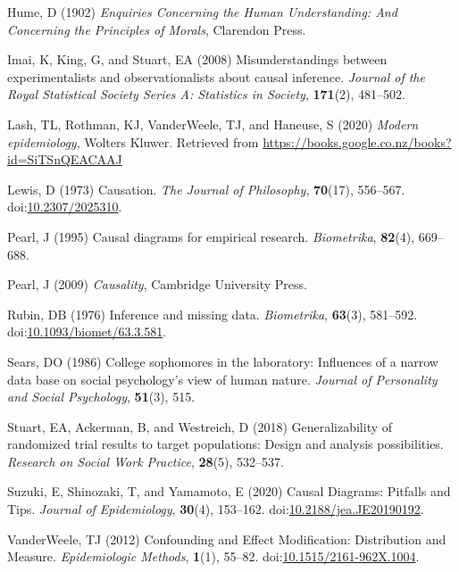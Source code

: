 \documentclass[
  single column]{article}
\newlength{\cslhangindent}
\newenvironment{CSLReferences}[2] %
 {\begin{list}{}{%
  \setlength{\itemindent}{0pt}
  \setlength{\leftmargin}{0pt}
  \setlength{\parsep}{0pt}
  \ifodd #1
   \setlength{\leftmargin}{\cslhangindent}
   \setlength{\itemindent}{-1\cslhangindent}
  \fi
  \setlength{\itemsep}{#2\baselineskip}}}
 {\end{list}}
\begin{document}
\begin{CSLReferences}{1}{0}
Hume, D (1902) \emph{Enquiries Concerning the Human Understanding: And
Concerning the Principles of Morals}, Clarendon Press.

Imai, K, King, G, and Stuart, EA (2008) Misunderstandings between
experimentalists and observationalists about causal inference.
\emph{Journal of the Royal Statistical Society Series A: Statistics in
Society}, \textbf{171}(2), 481--502.

Lash, TL, Rothman, KJ, VanderWeele, TJ, and Haneuse, S (2020)
\emph{Modern epidemiology}, Wolters Kluwer. Retrieved from
\url{https://books.google.co.nz/books?id=SiTSnQEACAAJ}

Lewis, D (1973) Causation. \emph{The Journal of Philosophy},
\textbf{70}(17), 556--567.
doi:\href{https://doi.org/10.2307/2025310}{10.2307/2025310}.

Pearl, J (1995) Causal diagrams for empirical research.
\emph{Biometrika}, \textbf{82}(4), 669--688.

Pearl, J (2009) \emph{Causality}, Cambridge University Press.

Rubin, DB (1976) Inference and missing data. \emph{Biometrika},
\textbf{63}(3), 581--592.
doi:\href{https://doi.org/10.1093/biomet/63.3.581}{10.1093/biomet/63.3.581}.

Sears, DO (1986) College sophomores in the laboratory: Influences of a
narrow data base on social psychology's view of human nature.
\emph{Journal of Personality and Social Psychology}, \textbf{51}(3),
515.

Stuart, EA, Ackerman, B, and Westreich, D (2018) Generalizability of
randomized trial results to target populations: Design and analysis
possibilities. \emph{Research on Social Work Practice}, \textbf{28}(5),
532--537.

Suzuki, E, Shinozaki, T, and Yamamoto, E (2020) Causal Diagrams:
Pitfalls and Tips. \emph{Journal of Epidemiology}, \textbf{30}(4),
153--162.
doi:\href{https://doi.org/10.2188/jea.JE20190192}{10.2188/jea.JE20190192}.

VanderWeele, TJ (2012) Confounding and Effect Modification: Distribution
and Measure. \emph{Epidemiologic Methods}, \textbf{1}(1), 55--82.
doi:\href{https://doi.org/10.1515/2161-962X.1004}{10.1515/2161-962X.1004}.


\end{CSLReferences}
\end{document}
